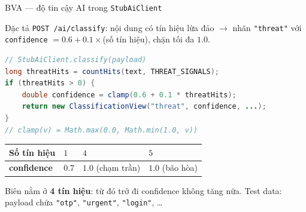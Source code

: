 \documentclass[aspectratio=169,12pt]{beamer}
\begin{document}
\begin{frame}[fragile,shrink=10]{BVA --- độ tin cậy AI trong \texttt{StubAiClient}}
  \begin{block}{Đặc tả}
    \texttt{POST /ai/classify}: nội dung có tín hiệu lừa đảo $\to$ nhãn
    \texttt{"threat"} với \texttt{confidence} $= 0.6 + 0.1\times$(số tín hiệu),
    chặn tối đa $1.0$.
  \end{block}

\begin{lstlisting}[language=java]
// StubAiClient.classify(payload)
long threatHits = countHits(text, THREAT_SIGNALS);
if (threatHits > 0) {
    double confidence = clamp(0.6 + 0.1 * threatHits);
    return new ClassificationView("threat", confidence, ...);
}
// clamp(v) = Math.max(0.0, Math.min(1.0, v))
\end{lstlisting}

  \begin{center}
  \small
  \begin{tabular}{llll}
    \toprule
    \textbf{Số tín hiệu} & $1$ & $4$ & $5$ \\
    \midrule
    \textbf{confidence} & $0.7$ & $1.0$ (chạm trần) & $1.0$ (bão hòa) \\
    \bottomrule
  \end{tabular}
  \end{center}

  {\small Biên nằm ở \textbf{4 tín hiệu}: từ đó trở đi confidence không tăng nữa.
  Test data: payload chứa \texttt{"otp"}, \texttt{"urgent"}, \texttt{"login"}, \ldots}
\end{frame}
\end{document}
